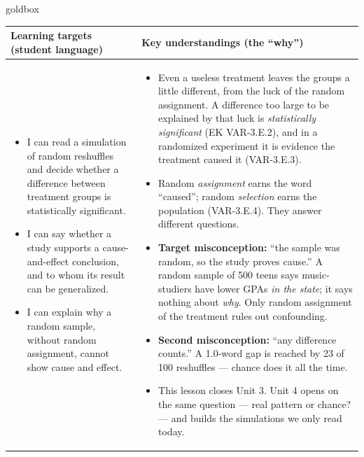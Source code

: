 \documentclass[10pt]{article}
\begin{document}
\renewcommand{\arraystretch}{1.4}
\boxguard
\begin{skillbox}{goldbox}
\begin{tabularx}{\linewidth}{@{}X|X@{}}
\textbf{Learning targets (student language)} & \textbf{Key understandings (the ``why'')} \\[2pt]
\hline
\vspace{-6pt}
\begin{itemize}[leftmargin=1.1em, nosep, after=\vspace{2pt}]
  \item I can read a simulation of random reshuffles and decide whether a difference between
        treatment groups is statistically significant.
  \item I can say whether a study supports a cause-and-effect conclusion, and to whom its
        result can be generalized.
  \item I can explain why a random sample, without random assignment, cannot show cause and
        effect.
\end{itemize}
&
\vspace{-6pt}
\begin{itemize}[leftmargin=1.1em, nosep, after=\vspace{2pt}]
  \item Even a useless treatment leaves the groups a little different, from the luck of the
        random assignment. A difference too large to be explained by that luck is
        \emph{statistically significant} (EK VAR-3.E.2), and in a randomized experiment it is
        evidence the treatment caused it (VAR-3.E.3).
  \item Random \emph{assignment} earns the word ``caused''; random \emph{selection} earns
        the population (VAR-3.E.4). They answer different questions.
  \item \textbf{Target misconception:} ``the sample was random, so the study proves cause.''
        A random sample of 500 teens says music-studiers have lower GPAs \emph{in the
        state}; it says nothing about \emph{why}. Only random assignment of the treatment
        rules out confounding.
  \item \textbf{Second misconception:} ``any difference counts.'' A 1.0-word gap is reached
        by 23 of 100 reshuffles --- chance does it all the time.
  \item This lesson closes Unit 3. Unit 4 opens on the same question --- real pattern or
        chance? --- and builds the simulations we only read today.
\end{itemize}
\end{tabularx}
\end{skillbox}
\end{document}

